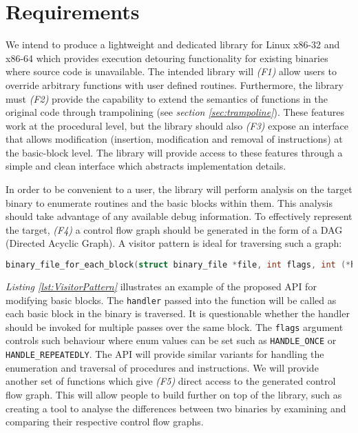 \section{Requirements}
\label{sec:Requirements}

We intend to produce a lightweight and dedicated library for Linux x86-32 and x86-64 which provides execution detouring functionality for existing binaries where source code is unavailable. The intended library will \emph{(F1)} allow users to override arbitrary functions with user defined routines. Furthermore, the library must  \emph{(F2)} provide the capability to extend the semantics of functions in the original code through trampolining (see \emph{section \ref{sec:trampoline}}). These features work at the procedural level, but the library should also \emph{(F3)} expose an interface that allows modification (insertion, modification and removal of instructions) at the basic-block level. The library will provide access to these features through a simple and clean interface which abstracts implementation details.

In order to be convenient to a user, the library will perform analysis on the target binary to enumerate routines and the basic blocks within them. This analysis should take advantage of any available debug information. To effectively represent the target, \emph{(F4)} a control flow graph should be generated in the form of a DAG (Directed Acyclic Graph). A visitor pattern is ideal for traversing such a graph:

\begin{lstlisting}[language=C,caption={API for traversal of control flow graph},label={lst:VisitorPattern}]
binary_file_for_each_block(struct binary_file *file, int flags, int (*handler)(struct block *block, struct context *ctx));
\end{lstlisting}

\emph{Listing \ref{lst:VisitorPattern}} illustrates an example of the proposed API for modifying basic blocks. The \texttt{handler} passed into the function will be called as each basic block in the binary is traversed. It is questionable whether the handler should be invoked for multiple passes over the same block. The \texttt{flags} argument controls such behaviour where enum values can be set such as \texttt{HANDLE\_ONCE} or \texttt{HANDLE\_REPEATEDLY}. The API will provide similar variants for handling the enumeration and traversal of procedures and instructions. We will provide another set of functions which give \emph{(F5)} direct access to the generated control flow graph. This will allow people to build further on top of the library, such as creating a tool to analyse the differences between two binaries by examining and comparing their respective control flow graphs.

